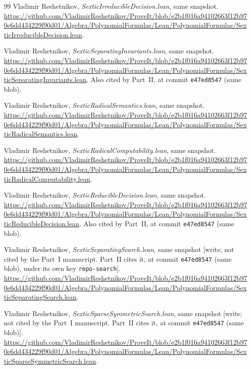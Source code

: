 \documentclass[11pt,letterpaper]{article}
\numberwithin{equation}{section}
\theoremstyle{definition}
\theoremstyle{remark}
\newcommand{\src}[1]{\texttt{\nolinkurl{#1}}}
\begin{document}
\begin{thebibliography}{99}
Vladimir Reshetnikov, \emph{SexticIrreducibleDecision.lean}, same snapshot.
\url{https://github.com/VladimirReshetnikov/ProveIt/blob/e2b1f016a94102663f12b970e6dd434229f90d01/Algebra/PolynomialFormulas/Lean/PolynomialFormulas/SexticIrreducibleDecision.lean}.

Vladimir Reshetnikov, \emph{SexticSeparatingInvariants.lean}, same snapshot.
\url{https://github.com/VladimirReshetnikov/ProveIt/blob/e2b1f016a94102663f12b970e6dd434229f90d01/Algebra/PolynomialFormulas/Lean/PolynomialFormulas/SexticSeparatingInvariants.lean}.
Also cited by Part~II, at commit \src{e47ed8547} (same blob).

Vladimir Reshetnikov, \emph{SexticRadicalSemantics.lean}, same snapshot.
\url{https://github.com/VladimirReshetnikov/ProveIt/blob/e2b1f016a94102663f12b970e6dd434229f90d01/Algebra/PolynomialFormulas/Lean/PolynomialFormulas/SexticRadicalSemantics.lean}.

Vladimir Reshetnikov, \emph{SexticRadicalComputability.lean}, same snapshot.
\url{https://github.com/VladimirReshetnikov/ProveIt/blob/e2b1f016a94102663f12b970e6dd434229f90d01/Algebra/PolynomialFormulas/Lean/PolynomialFormulas/SexticRadicalComputability.lean}.

Vladimir Reshetnikov, \emph{SexticReducibleDecision.lean}, same snapshot.
\url{https://github.com/VladimirReshetnikov/ProveIt/blob/e2b1f016a94102663f12b970e6dd434229f90d01/Algebra/PolynomialFormulas/Lean/PolynomialFormulas/SexticReducibleDecision.lean}.
Also cited by Part~II, at commit \src{e47ed8547} (same blob).

Vladimir Reshetnikov, \emph{SexticSeparatingSearch.lean}, same snapshot
[write; not cited by the Part~I manuscript. Part~II cites it, at commit
\src{e47ed8547} (same blob), under its own key \src{repo-search}].
\url{https://github.com/VladimirReshetnikov/ProveIt/blob/e2b1f016a94102663f12b970e6dd434229f90d01/Algebra/PolynomialFormulas/Lean/PolynomialFormulas/SexticSeparatingSearch.lean}.

Vladimir Reshetnikov, \emph{SexticSparseSymmetricSearch.lean}, same
snapshot [write; not cited by the Part~I manuscript. Part~II cites it, at
commit \src{e47ed8547} (same blob)].
\url{https://github.com/VladimirReshetnikov/ProveIt/blob/e2b1f016a94102663f12b970e6dd434229f90d01/Algebra/PolynomialFormulas/Lean/PolynomialFormulas/SexticSparseSymmetricSearch.lean}.


\end{thebibliography}
\end{document}
